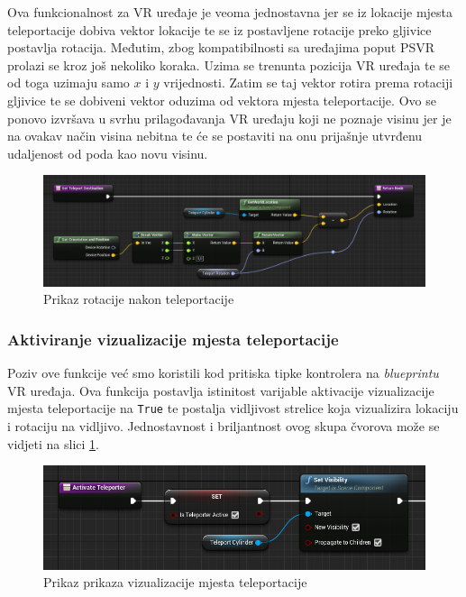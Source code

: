 \documentclass[a4paper,10pt]{article}
\begin{document}
Ova funkcionalnost za VR uređaje je veoma jednostavna jer se iz lokacije mjesta
teleportacije dobiva vektor lokacije te se iz postavljene rotacije preko
gljivice postavlja rotacija. Međutim, zbog kompatibilnosti sa uređajima poput
PSVR prolazi se kroz još nekoliko koraka. Uzima se trenunta pozicija VR uređaja
te se od toga uzimaju samo $x$ i $y$ vrijednosti. Zatim se taj vektor rotira prema
rotaciji gljivice te se dobiveni vektor oduzima od vektora mjesta
teleportacije. Ovo se ponovo izvršava u svrhu prilagođavanja VR uređaju koji ne
poznaje visinu jer je na ovakav način visina nebitna te će se postaviti na onu
prijašnje utvrđenu udaljenost od poda kao novu visinu.

\begin{figure}[!h]
	\centering
	\includegraphics[width=\textwidth]{slike/11.png}
	\caption{Prikaz rotacije nakon teleportacije}
\end{figure}


\subsubsection{Aktiviranje vizualizacije mjesta teleportacije}

Poziv ove funkcije već smo koristili kod pritiska tipke kontrolera na
\textit{blueprintu} VR uređaja. Ova funkcija postavlja istinitost varijable
aktivacije
vizualizacije mjesta teleportacije na \texttt{True} te postalja vidljivost strelice
koja vizualizira lokaciju i rotaciju na vidljivo. Jednostavnost i briljantnost
ovog skupa čvorova može se vidjeti na slici \ref{s12}.

\begin{figure}[!h]
	\centering
	\includegraphics[width=\textwidth]{slike/12.png}
	\caption{Prikaz prikaza vizualizacije mjesta teleportacije}
	\label{s12}
\end{figure}
\end{document}
